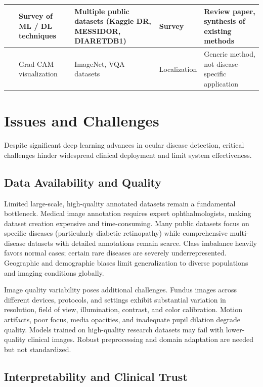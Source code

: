 \begin{table}[t]
\begin{tabular}{|p{1.8cm}|p{3.5cm}|p{3.8cm}|p{1.5cm}|p{3.2cm}|}
~\cite{R2} 
& Survey of ML / DL techniques 
& Multiple public datasets (Kaggle DR, MESSIDOR, DIARETDB1) 
& Survey 
& Review paper, synthesis of existing methods \\
\hline

~\cite{R8} 
& Grad-CAM visualization 
& ImageNet, VQA datasets 
& Localization 
& Generic method, not disease-specific application \\
\hline

\end{tabular}
\end{table}


\section{Issues and Challenges}
\label{sec:issues}

Despite significant deep learning advances in ocular disease detection, critical challenges hinder widespread clinical deployment and limit system effectiveness.

\subsection{Data Availability and Quality}

Limited large-scale, high-quality annotated datasets remain a fundamental bottleneck. Medical image annotation requires expert ophthalmologists, making dataset creation expensive and time-consuming. Many public datasets focus on specific diseases (particularly diabetic retinopathy) while comprehensive multi-disease datasets with detailed annotations remain scarce. Class imbalance heavily favors normal cases; certain rare diseases are severely underrepresented. Geographic and demographic biases limit generalization to diverse populations and imaging conditions globally.

Image quality variability poses additional challenges. Fundus images across different devices, protocols, and settings exhibit substantial variation in resolution, field of view, illumination, contrast, and color calibration. Motion artifacts, poor focus, media opacities, and inadequate pupil dilation degrade quality. Models trained on high-quality research datasets may fail with lower-quality clinical images. Robust preprocessing and domain adaptation are needed but not standardized.

\subsection{Interpretability and Clinical Trust}

